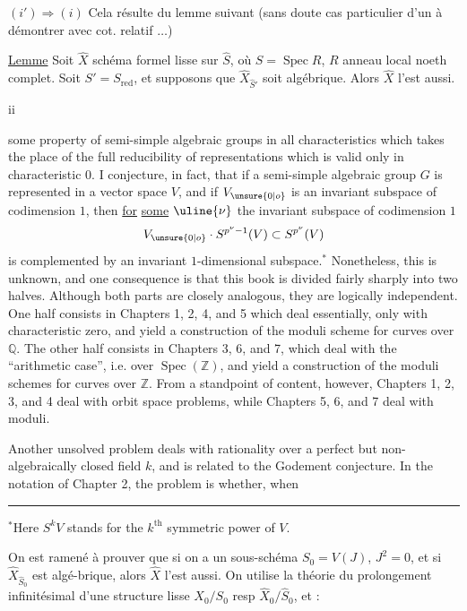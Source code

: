 $(i')\Longrightarrow(i)$ Cela résulte du lemme suivant (sans doute cas particulier d'un   à démontrer avec  cot. relatif $\ldots$)

\uline{Lemme} Soit $\widehat X$ schéma formel  lisse sur $\widehat S$, où $S=\operatorname{Spec}R$, $R$ anneau local noeth complet. Soit $S'=S_{\mathrm{red}}$, et supposons que $\widehat X_{\widehat S'}$ soit algébrique. Alors $\widehat X$ l'est aussi.


\begin{center}ii\end{center}

some property of semi-simple algebraic groups in all characteristics which takes the place of the full reducibility of representations which is valid only in characteristic $0$. I conjecture, in fact, that if a semi-simple algebraic group $G$ is represented in a vector space $V$, and if $V_{\unsure{0|o}}$ is an invariant subspace of codimension $1$, then \uline{for} \uline{some} $\uline{\nu}$ the invariant subspace of codimension $1$
\[
V_{\unsure{0|o}}\cdot S^{p^\nu-1}(V)\subset S^{p^\nu}(V)
\]
is complemented by an invariant $1$-dimensional subspace.$^*$ Nonetheless, this is unknown, and one consequence is that this book is divided fairly sharply into two halves. Although both parts are closely analogous, they are logically independent. One half consists in Chapters 1, 2, 4, and 5 which deal essentially, only with characteristic zero, and yield a construction of the moduli scheme for curves over $\mathbb Q$. The other half consists in Chapters 3, 6, and 7, which deal with the ``arithmetic case'', i.e. over $\operatorname{Spec}(\mathbb Z)$, and yield a construction of the moduli schemes for curves over $\mathbb Z$. From a standpoint of content, however, Chapters 1, 2, 3, and 4 deal with orbit space problems, while Chapters 5, 6, and 7 deal with moduli.

Another unsolved problem deals with rationality over a perfect but non-algebraically closed field $k$, and is related to the Godement conjecture. In the notation of Chapter 2, the problem is whether, when

\noindent\rule{2cm}{.4pt}

$^*$Here $S^kV$ stands for the $k^{\mathrm{th}}$ symmetric power of $V$.


On est ramené à prouver que si  on a un sous-schéma $S_0=V(J)$, $J^2=0$, et si $\widehat X_{\widehat S_0}$ est algé-brique, alors $\widehat X$ l'est aussi. On utilise la théorie du prolongement infinitésimal d'une structure lisse $X_0/S_0$ resp $\widehat X_0/\widehat S_0$, et :

